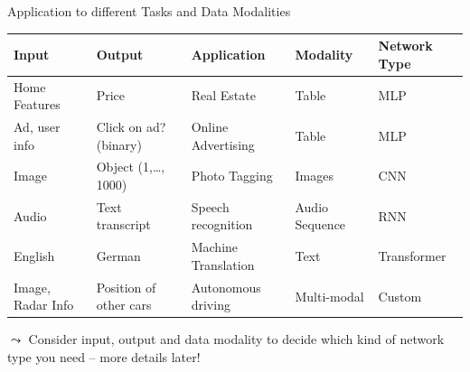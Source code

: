 \documentclass[aspectratio=169]{../latex_main/tntbeamer}  %
\begin{document}
  	\begin{frame}{Application to different Tasks and Data Modalities}

        {\centering
        \begin{tabular}{lllll}
             Input & Output & Application & Modality & Network Type  \\
             \midrule
             Home Features & Price & Real Estate & Table & MLP \\
             Ad, user info & Click on ad? (binary) & Online Advertising & Table & MLP\\
             Image & Object (1,\ldots, 1000) & Photo Tagging & Images & CNN\\
             Audio & Text transcript & Speech recognition & Audio Sequence & RNN\\
             English & German & Machine Translation & Text & Transformer\\
             Image, Radar Info & Position of other cars & Autonomous driving & Multi-modal & Custom
        \end{tabular}}

        \vspace{2em}

        $\leadsto$ Consider input, output and data modality to decide which kind of network type you need -- more details later!

	\end{frame}
	
\end{document}
